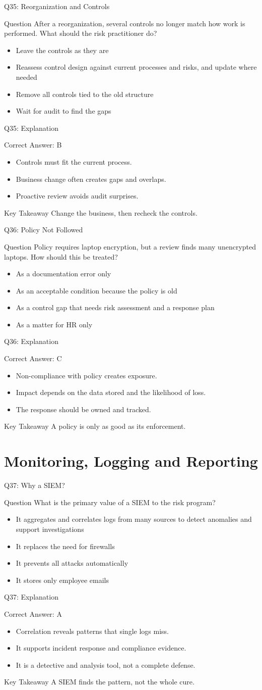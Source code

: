 \documentclass[aspectratio=169]{beamer}
\newcommand{\hq}[7]{%
	\begin{frame}{Q#1: #2}
		\begin{block}{Question}
			#3
		\end{block}
		\begin{itemize}
			#4
		\end{itemize}
	\end{frame}
	\begin{frame}{Q#1: Explanation}
		\begin{block}{Correct Answer: #5}
			\begin{itemize}
				#6
			\end{itemize}
		\end{block}
		\begin{alertblock}{Key Takeaway}
			#7
		\end{alertblock}
	\end{frame}
}
\begin{document}
	\hq{35}{Reorganization and Controls}
	{After a reorganization, several controls no longer match how work is performed. What should the risk practitioner do?}
	{\item[\textbf{(A)}] Leave the controls as they are
		\item[\textbf{(B)}] Reassess control design against current processes and risks, and update where needed
		\item[\textbf{(C)}] Remove all controls tied to the old structure
		\item[\textbf{(D)}] Wait for audit to find the gaps}
	{B}
	{\item Controls must fit the current process.
		\item Business change often creates gaps and overlaps.
		\item Proactive review avoids audit surprises.}
	{Change the business, then recheck the controls.}
	
	\hq{36}{Policy Not Followed}
	{Policy requires laptop encryption, but a review finds many unencrypted laptops. How should this be treated?}
	{\item[\textbf{(A)}] As a documentation error only
		\item[\textbf{(B)}] As an acceptable condition because the policy is old
		\item[\textbf{(C)}] As a control gap that needs risk assessment and a response plan
		\item[\textbf{(D)}] As a matter for HR only}
	{C}
	{\item Non-compliance with policy creates exposure.
		\item Impact depends on the data stored and the likelihood of loss.
		\item The response should be owned and tracked.}
	{A policy is only as good as its enforcement.}
	
	\section{Monitoring, Logging and Reporting}
	
	\hq{37}{Why a SIEM?}
	{What is the primary value of a SIEM to the risk program?}
	{\item[\textbf{(A)}] It aggregates and correlates logs from many sources to detect anomalies and support investigations
		\item[\textbf{(B)}] It replaces the need for firewalls
		\item[\textbf{(C)}] It prevents all attacks automatically
		\item[\textbf{(D)}] It stores only employee emails}
	{A}
	{\item Correlation reveals patterns that single logs miss.
		\item It supports incident response and compliance evidence.
		\item It is a detective and analysis tool, not a complete defense.}
	{A SIEM finds the pattern, not the whole cure.}
	
\end{document}
